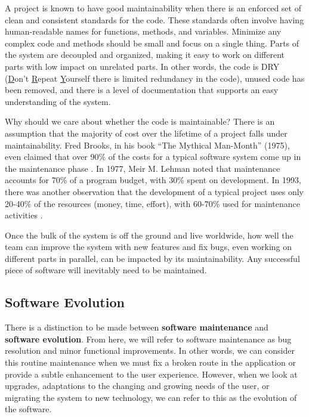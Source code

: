 A project is known to have good maintainability when there is an enforced set of clean and consistent standards for the code. These standards often involve having human-readable names for functions, methods, and variables. Minimize any complex code and methods should be small and focus on a single thing. Parts of the system are decoupled and organized, making it easy to work on different parts with low impact on unrelated parts. In other words, the code is DRY (\underline{D}on't \underline{R}epeat \underline{Y}ourself \textemdash there is limited redundancy in the code), unused code has been removed, and there is a level of documentation that supports an easy understanding of the system.


Why should we care about whether the code is maintainable? There is an assumption that the majority of cost over the lifetime of a project falls under maintainability. Fred Brooks, in his book ``The Mythical Man-Month'' (1975), even claimed that over 90\% of the costs for a typical software system come up in the maintenance phase \cite{brooks:mythical}. In 1977, Meir M. Lehman noted that maintenance accounts for 70\% of a program budget, with 30\% spent on development. In 1993, there was another observation that the development of a typical project uses only 20-40\% of the resources (money, time, effort), with 60-70\% used for maintenance activities \cite{ieee:1219}.

Once the bulk of the system is off the ground and live worldwide, how well the team can improve the system with new features and fix bugs, even working on different parts in parallel, can be impacted by its maintainability. Any successful piece of software will inevitably need to be maintained.

\subsection{Software Evolution} \label{subSoftwareEvolution}

There is a distinction to be made between \textbf{software maintenance} and \textbf{software evolution}. From here, we will refer to software maintenance as bug resolution and minor functional improvements. In other words, we can consider this routine maintenance when we must fix a broken route in the application or provide a subtle enhancement to the user experience. However, when we look at upgrades, adaptations to the changing and growing needs of the user, or migrating the system to new technology, we can refer to this as the evolution of the software.

